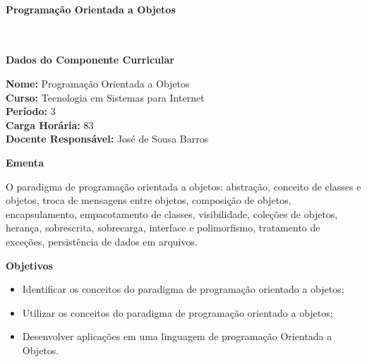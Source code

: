 \paragraph{Programação Orientada a Objetos} \


\begin{snugshade}\begin{center}\textbf{
	Dados do Componente Curricular
}\end{center}\end{snugshade}

\noindent 	\textbf{Nome:} Programação Orientada a Objetos
\\ 			\textbf{Curso:} Tecnologia em Sistemas para Internet
\\ 			\textbf{Período:} \unit{3}{\degree}
\\ 			\textbf{Carga Horária:} \unit{83}{\hour}
\\ 			\textbf{Docente Responsável:} José de Sousa Barros 



\begin{snugshade}\begin{center}\textbf{
    Ementa
\vphantom{q}}\end{center}\end{snugshade}

\noindent
O paradigma de programação orientada a objetos: abstração, conceito de classes e objetos, troca de mensagens entre objetos, composição de objetos, encapsulamento, empacotamento de classes, visibilidade, coleções de objetos, herança, sobrescrita, sobrecarga, interface e polimorfismo, tratamento de exceções, persistência de dados em arquivos.

\begin{snugshade}\begin{center}\textbf{
    Objetivos
}\end{center}\end{snugshade}

\begin{itemize}

\item Identificar os conceitos do paradigma de programação orientado a objetos;
\item Utilizar os conceitos do paradigma de programação orientado a objetos;
\item Desenvolver aplicações em uma linguagem de programação Orientada a Objetos.

\end{itemize} 

